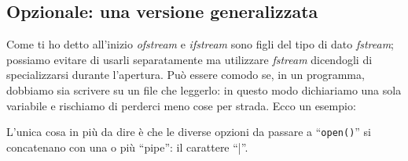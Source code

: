 \begin{small}
\subsection{Opzionale: una versione generalizzata}
Come ti ho detto all'inizio \emph{ofstream} e \emph{ifstream} sono figli del tipo di dato \emph{fstream}; possiamo evitare di usarli separatamente ma utilizzare \emph{fstream} dicendogli di specializzarsi durante l'apertura. Può essere comodo se, in un programma, dobbiamo sia scrivere su un file che leggerlo: in questo modo dichiariamo una sola variabile e rischiamo di perderci meno cose per strada. Ecco un esempio:


L'unica cosa in più da dire è che le diverse opzioni da passare a ``\verb|open()|'' si concatenano con una o più ``pipe'': il carattere ``|''.
\end{small}

